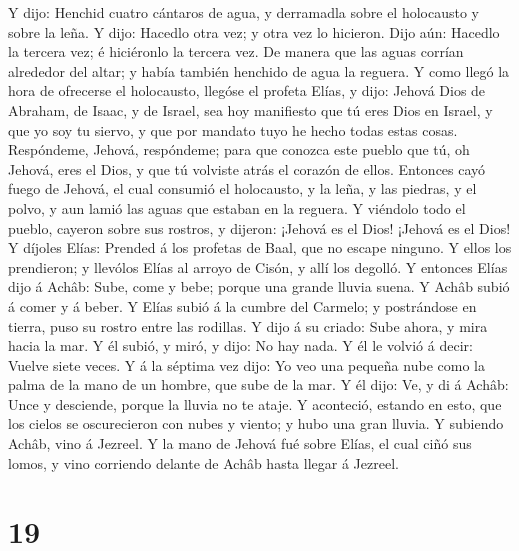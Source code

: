  Y dijo: Henchid cuatro cántaros de agua, y derramadla
sobre el holocausto y sobre la leña. Y dijo: Hacedlo otra vez; y otra
vez lo hicieron. Dijo aún: Hacedlo la tercera vez; é hiciéronlo la
tercera vez.  De manera que las aguas corrían alrededor
del altar; y había también henchido de agua la reguera. 
Y como llegó la hora de ofrecerse el holocausto, llegóse el profeta
Elías, y dijo: Jehová Dios de Abraham, de Isaac, y de Israel, sea hoy
manifiesto que tú eres Dios en Israel, y que yo soy tu siervo, y que por
mandato tuyo he hecho todas estas cosas.  Respóndeme,
Jehová, respóndeme; para que conozca este pueblo que tú, oh Jehová, eres
el Dios, y que tú volviste atrás el corazón de ellos. 
Entonces cayó fuego de Jehová, el cual consumió el holocausto, y la
leña, y las piedras, y el polvo, y aun lamió las aguas que estaban en la
reguera.  Y viéndolo todo el pueblo, cayeron sobre sus
rostros, y dijeron: ¡Jehová es el Dios! ¡Jehová es el Dios!
 Y díjoles Elías: Prended á los profetas de Baal, que no
escape ninguno. Y ellos los prendieron; y llevólos Elías al arroyo de
Cisón, y allí los degolló.  Y entonces Elías dijo á
Achâb: Sube, come y bebe; porque una grande lluvia suena.
 Y Achâb subió á comer y á beber. Y Elías subió á la
cumbre del Carmelo; y postrándose en tierra, puso su rostro entre las
rodillas.  Y dijo á su criado: Sube ahora, y mira hacia
la mar. Y él subió, y miró, y dijo: No hay nada. Y él le volvió á decir:
Vuelve siete veces.  Y á la séptima vez dijo: Yo veo una
pequeña nube como la palma de la mano de un hombre, que sube de la mar.
Y él dijo: Ve, y di á Achâb: Unce y desciende, porque la lluvia no te
ataje.  Y aconteció, estando en esto, que los cielos se
oscurecieron con nubes y viento; y hubo una gran lluvia. Y subiendo
Achâb, vino á Jezreel.  Y la mano de Jehová fué sobre
Elías, el cual ciñó sus lomos, y vino corriendo delante de Achâb hasta
llegar á Jezreel.

\hypertarget{section-18}{%
\section{19}\label{section-18}}

